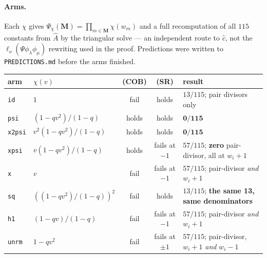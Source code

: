 \documentclass[11pt]{article}
\theoremstyle{plain}
\theoremstyle{definition}
\theoremstyle{remark}
\theoremstyle{plain}
\newcommand{\bM}{\mathbf{M}}
\newcommand{\Ah}{\widehat{A}}
\begin{document}
\paragraph{Arms.}  Each $\chi$ gives $\Psi_\chi(\bM)=\prod_{m\in\bM}\chi(w_m)$ and
a full recomputation of all $115$ constants from $\Ah$ by the triangular solve
--- an independent route to $\widehat c$, not the $\ell_\nu(\Psi\phi_\lambda\phi_\mu)$
rewriting used in the proof.  Predictions were written to
\texttt{PREDICTIONS.md} before the arms finished.

\begin{center}
\begin{tabular}{@{}llccl@{}}
\toprule
arm & $\chi(v)$ & (COB) & (SR) & result \\
\midrule
\texttt{id}    & $1$                    & fail  & holds       & $13/115$; pair divisors only \\
\texttt{psi}   & $(1-qv^2)/(1-q)$       & holds & holds       & $\mathbf{0/115}$ \\
\texttt{x2psi} & $v^2(1-qv^2)/(1-q)$    & holds & holds       & $\mathbf{0/115}$ \\
\texttt{xpsi}  & $v(1-qv^2)/(1-q)$      & holds & fails at $-1$ & $57/115$; \textbf{zero} pair-divisor, all at $w_i+1$ \\
\texttt{x}     & $v$                    & fail  & fails at $-1$ & $57/115$; pair-divisor \emph{and} $w_i+1$ \\
\texttt{sq}    & $((1-qv^2)/(1-q))^2$   & fail  & holds       & $13/115$; \textbf{the same 13, same denominators} \\
\texttt{h1}    & $(1-qv)/(1-q)$         & fail  & fails at $-1$ & $57/115$; pair-divisor \emph{and} $w_i+1$ \\
\texttt{unrm}  & $1-qv^2$               & fail  & fails at $\pm1$ & $57/115$; pair-divisor, $w_i+1$ \emph{and} $w_i-1$ \\
\bottomrule
\end{tabular}
\end{center}
\end{document}
